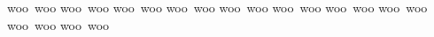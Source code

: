 
\startTEXpage[width=80mm,offset=5mm]
    \setupalign[flushright]woo woo woo woo woo woo woo woo woo woo\blank
    \setupalign [flushleft]woo woo woo woo woo woo woo woo woo woo\blank
\stopTEXpage
